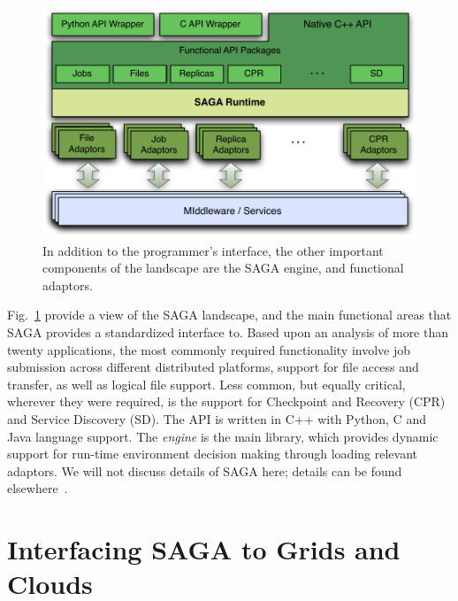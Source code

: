 \documentclass[conference,final]{IEEEtran}
\begin{document}
\begin{figure}[t]
\vspace{-2em}
\includegraphics[scale=0.5]{saga-figure02.pdf}
\caption{In addition to the programmer's interface,
  the other important components of the landscape are the SAGA engine,
  and functional adaptors.} \vspace{-2em}
\label{saga_figure}
\end{figure}

Fig.~\ref{saga_figure} provide a view of the SAGA landscape, and the
main functional areas that SAGA provides a standardized interface
to. Based upon an analysis of more than twenty applications, the most
commonly required functionality involve job submission across
different distributed platforms, support for file access and transfer,
as well as logical file support. Less common, but equally critical,
wherever they were required, is the support for Checkpoint and
Recovery (CPR) and Service Discovery (SD).  The API is written in C++
with Python, C and Java language support. The {\it engine} is the main
library, which provides dynamic support for run-time environment
decision making through loading relevant adaptors. We will not discuss
details of SAGA here; details can be found elsewhere~\cite{saga_url}.

\section{Interfacing SAGA to Grids and Clouds}
\end{document}
